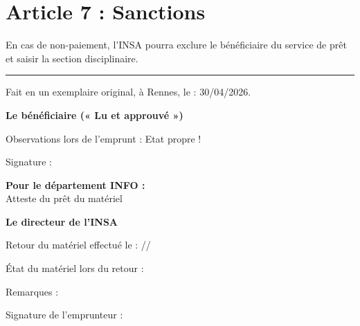 \documentclass[12pt,a4paper]{article}
\begin{document}
\section*{Article 7 : Sanctions}

En cas de non-paiement, l’INSA pourra exclure le bénéficiaire du service de prêt et saisir la section disciplinaire.

\vspace{0.5cm}
\rule{\linewidth}{1pt}
\vspace{0.5cm}

Fait en un exemplaire original, à Rennes, le : 30/04/2026.

\vspace{0.5cm}

\textbf{Le bénéficiaire (« Lu et approuvé »)} 

\vspace{0.4cm}

Observations lors de l’emprunt : Etat propre !

\vspace{0.4cm}

Signature :

\vspace{0.3cm}

\begin{minipage}{0.5\linewidth} 
\end{minipage} 
\hfill 
\begin{minipage}{0.5\linewidth} 
\textbf{Pour le département INFO :} \\[0.3cm] 
Atteste du prêt du matériel \\[0.4cm] 
\begin{center} 
\textbf{Le directeur de l’INSA} \\ 
\end{center} 
\end{minipage}

\vspace{1.2cm}

Retour du matériel effectué le : \underline{\hspace{2cm}}/\underline{\hspace{2cm}}/\underline{\hspace{2cm}}

\vspace{0.5cm}

État du matériel lors du retour : \\

\vspace{0.25cm}

Remarques : \\

\vspace{0.4cm}

Signature de l’emprunteur :
\end{document}
